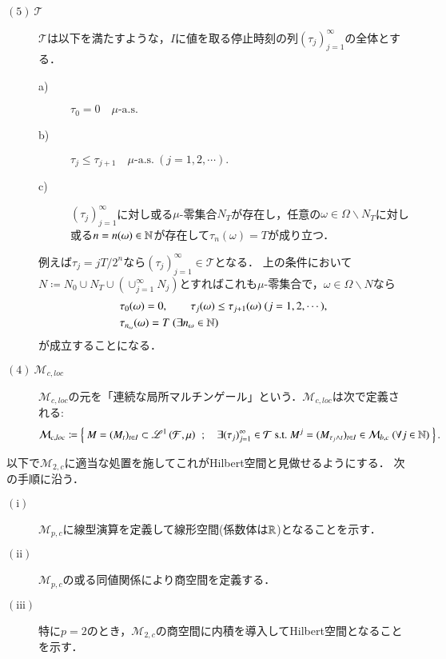 \begin{description}
		\item[$\mathrm{(5)}\ \mathcal{T}$]
			$\mathcal{T}$は以下を満たすような，$I$に値を取る停止時刻の列$(\tau_j)_{j=1}^{\infty}$の全体とする．
			\begin{description}
				\item[a)] $\tau_0 = 0 \quad \mbox{$\mu$-a.s.}$
				\item[b)] $\tau_j \leq \tau_{j+1} \quad \mbox{$\mu$-a.s.}\ (j=1,2,\cdots).$
				\item[c)] $(\tau_j)_{j=1}^{\infty}$に対し或る$\mu$-零集合$N_T$が存在し，任意の$\omega \in \Omega \backslash N_T$に対し或る$n = n(\omega) \in \mathbb{N}$が存在して$\tau_n(\omega)=T$が成り立つ．
			\end{description}
			例えば$\tau_j = jT/2^n$なら$(\tau_j)_{j=1}^{\infty} \in \mathcal{T}$となる．
			上の条件において$N \coloneqq N_0 \cup N_T \cup (\cup_{j=1}^{\infty}N_j)$とすればこれも$\mu$-零集合で，$\omega \in \Omega \backslash N$なら
			\begin{align}
				&\tau_0(\omega) = 0,\qquad \tau_j(\omega) \leq \tau_{j+1}(\omega)\ (j=1,2,\cdots),\\
				&\tau_{n_\omega}(\omega) = T\ (\exists n_\omega \in \mathbb{N})
			\end{align}
			が成立することになる．
			
		\item[$\mathrm{(4)}\ \mathcal{M}_{c,loc}$]
			$\mathcal{M}_{c,loc}$の元を「連続な局所マルチンゲール」という．$\mathcal{M}_{c,loc}$は次で定義される:
			\begin{align}
				\mathcal{M}_{c,loc} \coloneqq 
				\left\{\ M = (M_t)_{t \in I} \subset \mathscr{L}^{1} \left(\mathcal{F},\mu\right)\ \, ; \quad \exists (\tau_j)_{j=1}^{\infty} \in \mathcal{T}\ \mathrm{s.t.}\ M^j = (M_{\tau_j \wedge t})_{t \in I} \in \mathcal{M}_{b,c}\ (\forall j \in \mathbb{N})\ \right\}.
			\end{align}
	\end{description}
	
	以下で$\mathcal{M}_{2,c}$に適当な処置を施してこれがHilbert空間と見做せるようにする．
	次の手順に沿う．
	\begin{description}
		\item[$\mathrm{(i)}$] $\mathcal{M}_{p,c}$に線型演算を定義して線形空間(係数体は$\mathbb{R}$)となることを示す．
		\item[$\mathrm{(ii)}$] $\mathcal{M}_{p,c}$の或る同値関係により商空間を定義する．
		\item[$\mathrm{(iii)}$] 特に$p=2$のとき，$\mathcal{M}_{2,c}$の商空間に内積を導入してHilbert空間となることを示す．
	\end{description}
	
